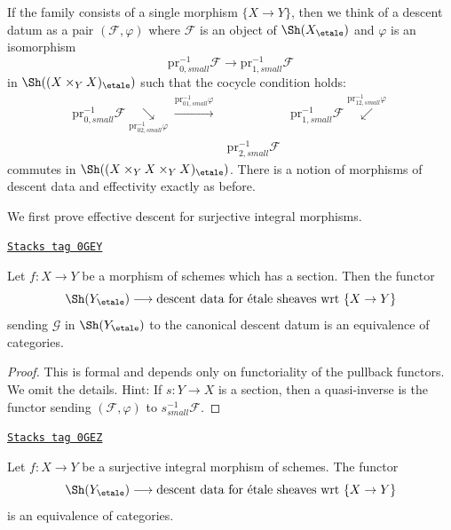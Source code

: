 \medskip\noindent
If the family consists of a single morphism $\{X \to Y\}$,
then we think of a descent datum as a pair $(\mathcal{F}, \varphi)$
where $\mathcal{F}$ is an object of $\Sh(X_\etale)$ and
$\varphi$ is an isomorphism
$$
\text{pr}_{0, small}^{-1} \mathcal{F}
\longrightarrow
\text{pr}_{1, small}^{-1} \mathcal{F}
$$
in $\Sh((X \times_Y X)_\etale)$ such that the cocycle condition holds:
$$
\begin{array}{ccc}\text{pr}_{0, small}^{-1}\mathcal{F}
\underset{\text{pr}_{02, small}^{-1}\varphi}{\searrow}\overset{\text{pr}_{01, small}^{-1}\varphi}{\longrightarrow} &  & \text{pr}_{1, small}^{-1}\mathcal{F}
\overset{\text{pr}_{12, small}^{-1}\varphi}{\swarrow} \\  & \text{pr}_{2, small}^{-1}\mathcal{F} & \end{array}
$$
commutes in $\Sh((X \times_Y X \times_Y X)_\etale)$.
There is a notion of morphisms of descent data and effectivity
exactly as before.

\medskip\noindent
We first prove effective descent for surjective integral morphisms.

\begin{lemma}
\label{etale-cohomology-lemma-glue-etale-sheaf-section}
\href{https://stacks.math.columbia.edu/tag/0GEY}{\texttt{Stacks tag 0GEY}}

Let $f : X \to Y$ be a morphism of schemes which has a section. Then the
functor
$$
\Sh(Y_\etale)
\longrightarrow
\text{descent data for \'etale sheaves wrt }\{X \to Y\}
$$
sending $\mathcal{G}$ in $\Sh(Y_\etale)$ to the canonical descent datum
is an equivalence of categories.
\end{lemma}

\begin{proof}
This is formal and depends only on functoriality of the pullback
functors. We omit the details. Hint: If $s : Y \to X$ is a section,
then a quasi-inverse is the functor sending $(\mathcal{F}, \varphi)$
to $s_{small}^{-1}\mathcal{F}$.
\end{proof}

\begin{lemma}
\label{etale-cohomology-lemma-glue-etale-sheaf-integral-surjective}
\href{https://stacks.math.columbia.edu/tag/0GEZ}{\texttt{Stacks tag 0GEZ}}

Let $f : X \to Y$ be a surjective integral morphism of schemes.
The functor
$$
\Sh(Y_\etale)
\longrightarrow
\text{descent data for \'etale sheaves wrt }\{X \to Y\}
$$
is an equivalence of categories.
\end{lemma}

